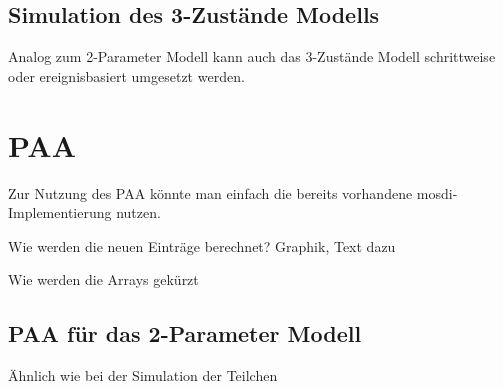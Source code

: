 \subsection{Simulation des 3-Zustände Modells}

Analog zum 2-Parameter Modell kann auch das 3-Zustände Modell schrittweise oder ereignisbasiert umgesetzt werden.

\section{PAA}

Zur Nutzung des PAA könnte man einfach die bereits vorhandene mosdi-Implementierung nutzen. 

Wie werden die neuen Einträge berechnet? Graphik, Text dazu

Wie werden die Arrays gekürzt

\subsection{PAA für das 2-Parameter Modell}

Ähnlich wie bei der Simulation der Teilchen 

